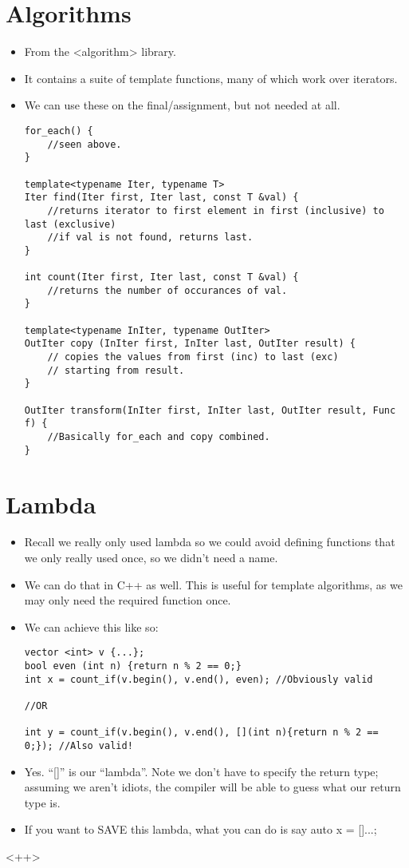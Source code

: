 \documentclass{article}
\begin{document}
\section{Algorithms}
\begin{itemize}
\item From the <algorithm> library.
\item It contains a suite of template functions, many of which work over iterators.
\item We can use these on the final/assignment, but not needed at all.
\begin{lstlisting}
for_each() {
    //seen above.
}

template<typename Iter, typename T>
Iter find(Iter first, Iter last, const T &val) {
    //returns iterator to first element in first (inclusive) to last (exclusive)
    //if val is not found, returns last.
}

int count(Iter first, Iter last, const T &val) {
    //returns the number of occurances of val.
}

template<typename InIter, typename OutIter>
OutIter copy (InIter first, InIter last, OutIter result) {
    // copies the values from first (inc) to last (exc)
    // starting from result.
}

OutIter transform(InIter first, InIter last, OutIter result, Func f) {
    //Basically for_each and copy combined.
}

\end{lstlisting}
\end{itemize}

\section{Lambda}
\begin{itemize}
\item Recall we really only used lambda so we could avoid defining functions that we only really used once, so we didn't need a name.
\item We can do that in C++ as well.  This is useful for template algorithms, as we may only need the required function once.
\item We can achieve this like so:
\begin{lstlisting}
vector <int> v {...};
bool even (int n) {return n % 2 == 0;}
int x = count_if(v.begin(), v.end(), even); //Obviously valid

//OR

int y = count_if(v.begin(), v.end(), [](int n){return n % 2 == 0;}); //Also valid!
\end{lstlisting}
\item Yes.  ``[]'' is our ``lambda''.  Note we don't have to specify the return type; assuming we aren't idiots, the compiler will be able to guess what our return type is.
\item If you want to SAVE this lambda, what you can do is say auto x = []{...};

\end{itemize}
<++>
\end{document}
